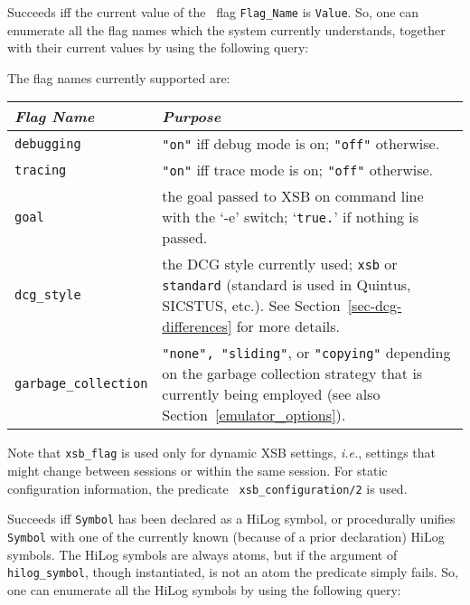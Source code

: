 \begin{description}
    Succeeds iff the current value of the \ourprolog\ flag {\tt Flag\_Name} is 
    {\tt Value}. So, one can enumerate all the flag names which the system
    currently understands, together with their current values by using the
    following query:


    The flag names currently supported are:

    \begin{center}
    \begin{tabular}{||l|p{11cm}||}               \hline
	{\em Flag Name}		& {\em Purpose} \\ \hline \hline
	{\tt debugging}		& 
		{\tt "on"} iff debug mode is on; {\tt "off"} otherwise.\\
		\hline
	{\tt tracing}		& 
		{\tt "on"} iff trace mode is on; {\tt "off"} otherwise.\\
		\hline
	{\tt goal}		& 
		the goal passed to XSB on command line with the `-e'
                switch; `{\tt true.}' if nothing is passed.
                \\ \hline
        {\tt dcg\_style}        &
                the DCG style currently used; {\tt xsb} or {\tt standard}
                (standard is used in Quintus, SICSTUS, etc.).
                See Section~\ref{sec-dcg-differences} for more details.
                \\ \hline
	{\tt garbage\_collection} &
		{\tt "none", "sliding"}, or {\tt "copying"} depending
		on the garbage collection strategy that is currently
		being employed (see also Section~\ref{emulator_options}).
                \\ \hline
    \end{tabular}
    \end{center}
    
    Note that {\tt xsb\_flag} is used only for dynamic XSB settings, {\it
      i.e.}, settings that might change between sessions or within the same
    session. For static configuration information, the predicate {\tt
      xsb\_configuration/2} is used.  

    Succeeds iff {\tt Symbol} has been declared as a HiLog symbol, or 
    procedurally unifies {\tt Symbol} with one of the currently known 
    (because of a prior declaration) HiLog symbols. The HiLog symbols
    are always atoms, but if the argument of {\tt hilog\_symbol},
    though instantiated, is not an atom the predicate simply fails.
    So, one can enumerate all the HiLog symbols by using the following
    query:


\end{description}
